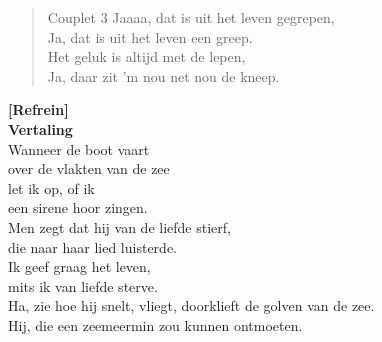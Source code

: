 \begin{verse}{Couplet 3}
Jaaaa, dat is uit het leven gegrepen,\\
Ja, dat is uit het leven een greep.\hspace{1.5em}\\
Het geluk is altijd met de lepen,\\
Ja, daar zit 'm nou net nou de kneep.\hspace{1.5em}
\end{verse}

\textbf{[Refrein]}\\

\vspace{15em}
\textbf{Vertaling}\\
Wanneer de boot vaart\\
over de vlakten van de zee\\
let ik op, of ik\\
een sirene hoor zingen.\\
Men zegt dat hij van de liefde stierf,\\
die naar haar lied luisterde.\\
Ik geef graag het leven,\\
mits ik van liefde sterve.\\
Ha, zie hoe hij snelt, vliegt, doorklieft de golven van de zee.\\
Hij, die een zeemeermin zou kunnen ontmoeten.\\
